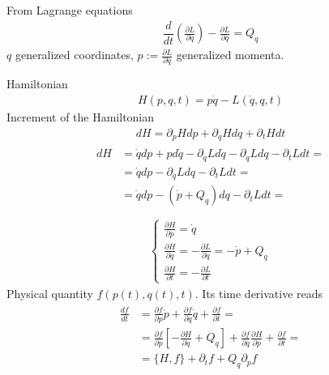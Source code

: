 \documentclass[letterpaper,10pt,english]{jupyterBook}
\begin{document}
\sphinxAtStartPar
From Lagrange equations
\begin{equation*}
\begin{split}\dfrac{d}{dt} \left( \frac{\partial L}{\partial \dot{q}} \right) - \frac{\partial L}{\partial q} = Q_q\end{split}
\end{equation*}
\sphinxAtStartPar
\(q\) generalized coordinates, \(p:= \frac{\partial L}{\partial \dot{q}}\) generalized momenta.

\sphinxAtStartPar
Hamiltonian
\begin{equation*}
\begin{split}H(p,q,t) = p \dot{q} - L(\dot{q}, q, t)\end{split}
\end{equation*}
\sphinxAtStartPar
Increment of the Hamiltonian
\begin{equation*}
\begin{split}dH = \partial_p H dp + \partial_q H dq + \partial_t H dt \end{split}
\end{equation*}\begin{equation*}
\begin{split}\begin{aligned}
  dH & = \dot{q} dp + p d \dot{q} - \partial_{\dot{q}} L d \dot{q} - \partial_{q} L d q - \partial_t L d t = \\
     & = \dot{q} dp - \partial_{q} L d q - \partial_t L d t = \\
     & = \dot{q} dp - \left( \dot{p} + Q_q \right) d q - \partial_t L d t = \\
\end{aligned}\end{split}
\end{equation*}\begin{equation*}
\begin{split}\begin{cases}
  \frac{\partial H}{\partial p} = \dot{q} \\
  \frac{\partial H}{\partial q} = - \frac{\partial L}{\partial q} = - \dot{p} + Q_q \\
  \frac{\partial H}{\partial t} = - \frac{\partial L}{\partial t}
\end{cases}\end{split}
\end{equation*}
\sphinxAtStartPar
Physical quantity \(f(p(t), q(t), t)\). Its time derivative reads
\begin{equation*}
\begin{split}\begin{aligned}
\frac{d f}{dt}
  & = \frac{\partial f}{\partial p} \dot{p} + \frac{\partial f}{\partial q} \dot{q} + \frac{\partial f}{\partial t} = \\
  & = \frac{\partial f}{\partial p} \left[ - \frac{\partial H}{\partial q} + Q_q \right] + \frac{\partial f}{\partial q} \frac{\partial H}{\partial p} + \frac{\partial f}{\partial t} = \\
  & = \{ H, f \} + \partial_t f + Q_q \partial_p f
\end{aligned}\end{split}
\end{equation*}
\end{document}
